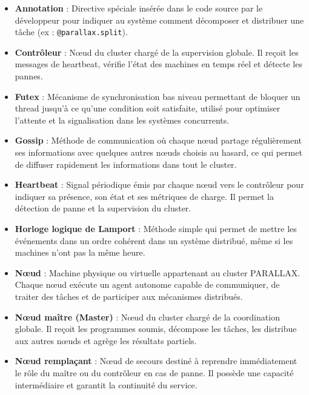 \documentclass[12pt,a4paper]{report}
\theoremstyle{definition}
\begin{document}
\begin{itemize}

    \item[*] \textbf{Annotation} : Directive spéciale insérée dans le code source par le développeur pour indiquer au système comment décomposer et distribuer une tâche (ex : \texttt{@parallax.split}).

    \item[*]  \textbf{Contrôleur} : Nœud du cluster chargé de la supervision globale. Il reçoit les messages de heartbeat, vérifie l’état des machines en temps réel et détecte les pannes.

    \item[*] \textbf{Futex} : Mécanisme de synchronisation bas niveau permettant de bloquer un thread jusqu'à ce qu'une condition soit satisfaite, utilisé pour optimiser l’attente et la signalisation dans les systèmes concurrents.

   \item[*]  \textbf{Gossip} : Méthode de communication où chaque nœud partage régulièrement ses informations avec quelques autres nœuds choisis au hasard, ce qui permet de diffuser rapidement les informations dans tout le cluster.

    \item[*]  \textbf{Heartbeat} : Signal périodique émis par chaque nœud vers le contrôleur pour indiquer sa présence, son état et ses métriques de charge. Il permet la détection de panne et la supervision du cluster.

    \item[*]  \textbf{Horloge logique de Lamport} : Méthode simple qui permet de mettre les événements dans un ordre cohérent dans un système distribué, même si les machines n’ont pas la même heure.

    \item [*] \textbf{Nœud} : Machine physique ou virtuelle appartenant au cluster PARALLAX. Chaque nœud exécute un agent autonome capable de communiquer, de traiter des tâches et de participer aux mécanismes distribués.

    \item[*]  \textbf{Nœud maître (Master)} : Nœud du cluster chargé de la coordination globale. Il reçoit les programmes soumis, décompose les tâches, les distribue aux autres nœuds et agrège les résultats partiels.

    \item[*]  \textbf{Nœud remplaçant} : Nœud de secours destiné à reprendre immédiatement le rôle du maître ou du contrôleur en cas de panne. Il possède une capacité intermédiaire et garantit la continuité du service.


\end{itemize}
\end{document}
